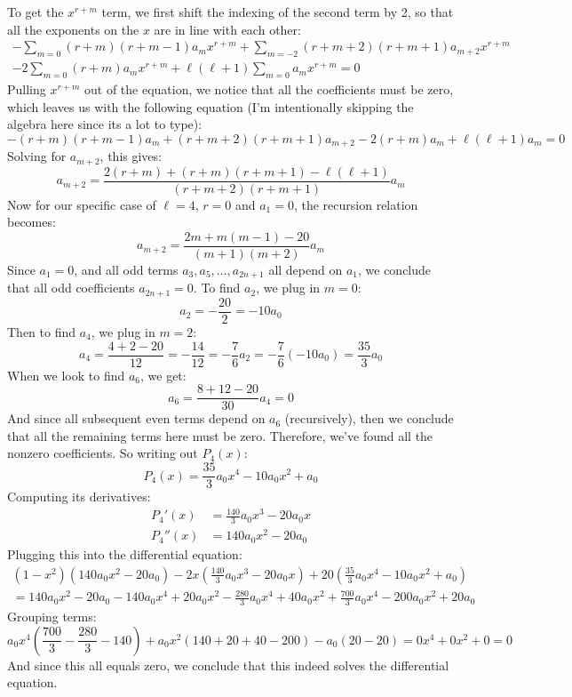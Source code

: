 \documentclass{article}
\begin{document}
\begin{solution}
	To get the $x^{r+m}$ term, we first shift the indexing of the second term by 2, so that all the exponents
	on the $x$ are in line with each other:
	\begin{multline*}
		-\sum_{m=0} (r+m)(r+m-1)a_mx^{r+m} + \sum_{m = -2}(r+m+2)(r+m+1)a_{m+2}x^{r+m} \\- 2\sum_{m = 0}(r+m)
		a_mx^{r+m} + \ell(\ell+1)\sum_{m = 0} a_m x^{r+m} = 0
	\end{multline*}
	Pulling $x^{r+m}$ out of the equation, we notice that all the coefficients must be zero, which leaves
	us with the following equation (I'm intentionally skipping the algebra here since its a lot to type):
	\[
		-(r+m)(r+m-1)a_m + (r+m+2)(r+m+1)a_{m+2} - 2(r+m)a_m + \ell(\ell+1) a_m = 0
	\] 
	Solving for $a_{m+2}$, this gives:
	\[
		a_{m+2} = \frac{2(r+m) + (r+m)(r+m+1) - \ell(\ell+1)}{(r+m+2)(r+m+1)}a_m 
	\] 
	Now for our specific case of $\ell=4$, $r = 0$ and $a_1 = 0$, the recursion relation becomes:
	\[
		a_{m+2} = \frac{2m+m(m-1) - 20}{(m+1)(m+2)}a_m
	\] 
	Since $a_1 = 0$, and all odd terms $a_3, a_5, \dots, a_{2n +1}$ all depend on $a_1$, we conclude that 
	all odd coefficients $a_{2n+1} = 0$. To find $a_2$, we plug in $m =0$:
	\[
	a_2 = -\frac{20}{2} = -10a_0
	\] 
	Then to find $a_4$, we plug in $m=2$:
	\[
		a_4 = \frac{4 +2 - 20}{12} = -\frac{14}{12} = -\frac{7}{6}a_2 = -\frac{7}{6}(-10a_0) = \frac{35}{3}a_0
	\] 
	When we look to find $a_6$, we get:
	\[
		a_6 = \frac{8 + 12 - 20}{30} a_4 = 0
	\] 
	And since all subsequent even terms depend on $a_6$ (recursively), then we conclude that all the remaining
	terms here must be zero. Therefore, we've found all the nonzero coefficients. So writing out $P_4(x)$:
	\[
	P_4(x) = \frac{35}{3}a_0x^4 -10a_0x^2 + a_0
	\] 
	Computing its derivatives:
	\begin{align*}
		P_4'(x) &= \frac{140}{3}a_0x^3 - 20a_0x\\
		P_4''(x) &= 140a_0x^2 - 20a_0 
	\end{align*}
	Plugging this into the differential equation:
	\begin{multline*}
		(1-x^2)(140a_0x^2 - 20a_0) - 2x\left( \frac{140}{3}a_0x^3 - 20a_0x \right) + 20\left( \frac{35}{3}a_0x^4 - 10a_0x^2 + a_0 \right) \\= 140a_0x^2 - 20a_0 - 140a_0x^4 + 20a_0x^2 - \frac{280}{3}a_0x^4 + 40a_0x^2 + \frac{700}{3}a_0x^4 - 200a_0x^2 + 20a_0
	\end{multline*}
	Grouping terms:
	\[
	a_0x^4\left( \frac{700}{3} - \frac{280}{3} - 140\right) + a_0x^2(140 + 20 + 40 - 200) - a_0(20 - 20) = 0x^4 + 0x^2 + 0 = 0 
	\] 
	And since this all equals zero, we conclude that this indeed solves the differential equation.
\end{solution}
\bigskip
\dphline
\pagebreak
\end{document}
